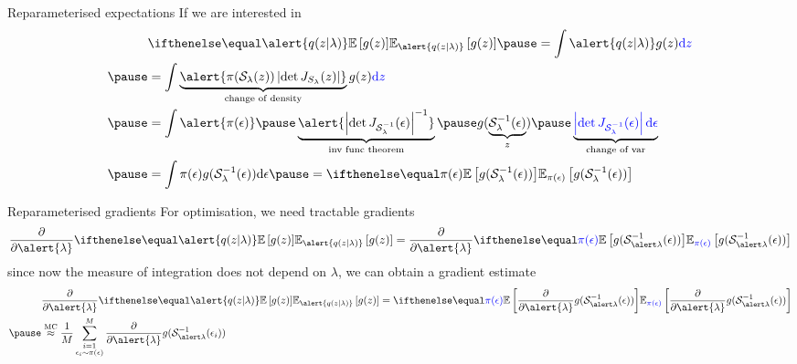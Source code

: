 \documentclass[14pt,dvipsnames]{beamer}
\begin{document}
\begin{frame}{Reparameterised expectations}
	If we are interested in 
	\begin{equation*}
	\begin{aligned}
		&  \E[\alert{q(z|\lambda)}]{g(z)} \pause = \int \alert{q(z|\lambda)} g(z) \textcolor{blue}{\dd z} \\ \pause
		&= \int \underbrace{\alert{\pi(\mathcal S_\lambda(z)) \djac{S_\lambda}{z}}}_{\text{change of density}} g(z) \textcolor{blue}{\dd z} \\ \pause
		&= \int \alert{\pi(\epsilon)} \pause \underbrace{\alert{\djac{\inv{\mathcal S}_\lambda}{\epsilon}^{-1}}}_{\text{inv func theorem}} \pause g(\underbrace{\inv{\mathcal S}_\lambda(\epsilon)}_{z}) \pause \underbrace{\textcolor{blue}{\djac{\inv{\mathcal S}_\lambda}{\epsilon} \dd \epsilon}}_{\text{change of var}} \\ \pause
		&= \int \pi(\epsilon) g(\inv{\mathcal S}_\lambda(\epsilon))\dd \epsilon \pause = \E[\pi(\epsilon)]{g(\inv{\mathcal S}_\lambda(\epsilon)) }
	\end{aligned}
	\end{equation*}
\end{frame}

\begin{frame}{Reparameterised gradients}
	For optimisation, we need tractable gradients
	\begin{equation*}
		\begin{aligned}
			\pdv{\alert{\lambda}}  \E[\alert{q(z|\lambda)}]{g(z)} = \pdv{\alert{\lambda}} \E[\textcolor{blue}{\pi(\epsilon)}]{g(\inv{\mathcal S}_{\alert\lambda}(\epsilon)) }
		\end{aligned}
	\end{equation*} \pause
	since now the measure of integration does not depend on $\lambda$, we can obtain a gradient estimate
	\begin{equation*}
		\begin{aligned}
			&\pdv{\alert{\lambda}}  \E[\alert{q(z|\lambda)}]{g(z)} =  \E[\textcolor{blue}{\pi(\epsilon)}]{\pdv{\alert{\lambda}} g(\inv{\mathcal S}_{\alert\lambda}(\epsilon)) } \\ \pause
			&\overset{\text{MC}}{\approx}  \frac{1}{M} \sum_{\substack{i=1\\ \epsilon_i \sim \pi(\epsilon)}}^M \pdv{\alert{\lambda}} g(\inv{\mathcal S}_{\alert\lambda}(\epsilon_i)) 
		\end{aligned}
	\end{equation*}
\end{frame}
\end{document}
